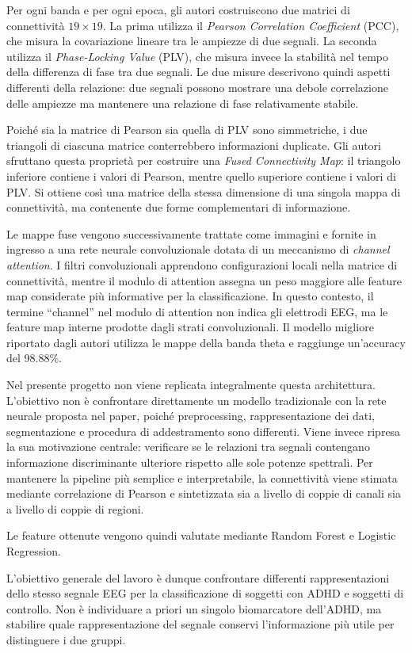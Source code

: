 Per ogni banda e per ogni epoca, gli autori costruiscono due matrici
di connettività \(19 \times 19\). La prima utilizza il
\textit{Pearson Correlation Coefficient} (PCC), che misura la
covariazione lineare tra le ampiezze di due segnali. La seconda
utilizza il \textit{Phase-Locking Value} (PLV), che misura invece la
stabilità nel tempo della differenza di fase tra due segnali. Le due
misure descrivono quindi aspetti differenti della relazione: due
segnali possono mostrare una debole correlazione delle ampiezze ma
mantenere una relazione di fase relativamente stabile.

Poiché sia la matrice di Pearson sia quella di PLV sono simmetriche,
i due triangoli di ciascuna matrice conterrebbero informazioni
duplicate. Gli autori sfruttano questa proprietà per costruire una
\textit{Fused Connectivity Map}: il triangolo inferiore contiene i
valori di Pearson, mentre quello superiore contiene i valori di PLV.
Si ottiene così una matrice della stessa dimensione di una singola
mappa di connettività, ma contenente due forme complementari di
informazione.

Le mappe fuse vengono successivamente trattate come immagini e
fornite in ingresso a una rete neurale convoluzionale dotata di un
meccanismo di \textit{channel attention}. I filtri convoluzionali
apprendono configurazioni locali nella matrice di connettività, mentre
il modulo di attention assegna un peso maggiore alle feature map
considerate più informative per la classificazione. In questo
contesto, il termine ``channel'' nel modulo di attention non indica
gli elettrodi EEG, ma le feature map interne prodotte dagli strati
convoluzionali. Il modello migliore riportato dagli autori utilizza
le mappe della banda theta e raggiunge un'accuracy del
98.88\%.

Nel presente progetto non viene replicata integralmente questa
architettura. L'obiettivo non è confrontare direttamente un modello
tradizionale con la rete neurale proposta nel paper, poiché
preprocessing, rappresentazione dei dati, segmentazione e procedura
di addestramento sono differenti. Viene invece ripresa la sua
motivazione centrale: verificare se le relazioni tra segnali
contengano informazione discriminante ulteriore rispetto alle sole
potenze spettrali. Per mantenere la pipeline più semplice e
interpretabile, la connettività viene stimata mediante correlazione
di Pearson e sintetizzata sia a livello di coppie di canali sia a
livello di coppie di regioni. 

Le feature ottenute vengono quindi
valutate mediante Random Forest e Logistic Regression.

L'obiettivo generale del lavoro è dunque confrontare differenti
rappresentazioni dello stesso segnale EEG per la classificazione di
soggetti con ADHD e soggetti di controllo. Non è individuare a priori un singolo biomarcatore dell'ADHD, ma stabilire quale rappresentazione del
segnale conservi l'informazione più utile per distinguere i due
gruppi.